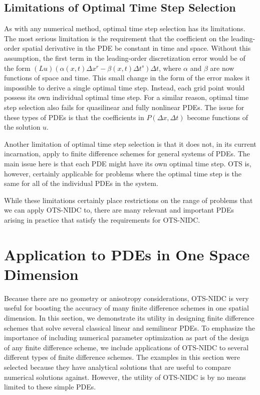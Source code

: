 \documentclass[fleqn,12pt,twoside]{article}
\def\dt{\Delta t}
\def\dx{\Delta x}
\begin{document}
\subsection{Limitations of Optimal Time Step Selection}
As with any numerical method, optimal time step selection has its limitations.
The most serious limitation is the requirement that the coefficient on the 
leading-order spatial derivative in the PDE be constant in time and space.  
Without this assumption, the first term in the leading-order discretization 
error would be of the form $(L u) (\alpha(x,t) \dx^r - \beta(x,t) \dt^s) \dt$,
where $\alpha$ and $\beta$ are now functions of space and time.  This
small change in the form of the error makes it impossible to derive a single 
optimal time step.  Instead, each grid point would possess its own individual 
optimal time step.  For a similar reason, optimal time step selection also 
fails for quasilinear and fully nonlinear PDEs.  The issue for these types of 
PDEs is that the coefficients in $P(\dx, \dt)$ become functions of the 
solution $u$.

Another limitation of optimal time step selection is that it does not,
in its current incarnation, apply to finite difference schemes for general
systems of PDEs.  The main issue here is that each PDE might have its 
own optimal time step.  OTS is, however, certainly applicable for problems 
where the optimal time step is the same for all of the individual PDEs in the 
system.

While these limitations certainly place restrictions on the range of problems 
that we can apply OTS-NIDC to, there are many relevant and important PDEs 
arising in practice that satisfy the requirements for OTS-NIDC.  


\section{\label{sec:applications_1d} 
         Application to PDEs in One Space Dimension}
Because there are no geometry or anisotropy considerations, OTS-NIDC is very 
useful for boosting the accuracy of many finite difference schemes in one 
spatial dimension.  In this section, we demonstrate its utility in designing 
finite difference schemes that solve several classical linear and semilinear 
PDEs.  To emphasize the importance of including numerical parameter 
optimization as part of the design of any finite difference scheme, we 
include applications of OTS-NIDC to several different types of finite 
difference schemes.  The examples in this section were selected because they 
have analytical solutions that are useful to compare numerical solutions 
against.  However, the utility of OTS-NIDC is by no means limited to 
these simple PDEs.
\end{document}
